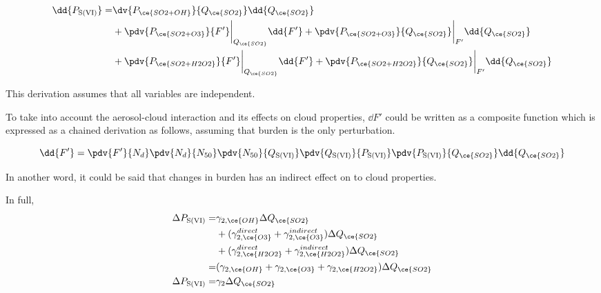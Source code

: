 \begin{equation}
\begin{aligned}
    \dd{P_{\text{S(VI)}}} = & 
    \dv{P_{\ce{SO2 + OH}}}{Q_{\ce{SO2}}} \dd{Q_{\ce{SO2}}} \\
    &+\pdv{P_{\ce{SO2 + O3}}}{F'}\bigg|_{Q_{\ce{SO2}}} \dd{F'} 
     +\pdv{P_{\ce{SO2 + O3}}}{Q_{\ce{SO2}}}\bigg|_{F'} \dd{Q_{\ce{SO2}}} \\
    &+\pdv{P_{\ce{SO2 + H2O2}}}{F'}\bigg|_{Q_{\ce{SO2}}} \dd{F'} 
     +\pdv{P_{\ce{SO2 + H2O2}}}{Q_{\ce{SO2}}}\bigg|_{F'} \dd{Q_{\ce{SO2}}} \\
\end{aligned}
\end{equation}

This derivation assumes that all variables are independent.

To take into account the aerosol-cloud interaction and its effects on cloud properties, $\dd{F'}$ could be written as a composite function which is expressed as a chained derivation as follows, assuming that  burden is the only perturbation.

\begin{equation}
    \dd{F'} = \pdv{F'}{N_d} \pdv{N_d}{N_{50}} \pdv{N_{50}}{Q_{\text{S(VI)}}} \pdv{Q_{\text{S(VI)}}}{P_{\text{S(VI)}}} \pdv{P_{\text{S(VI)}}}{Q_{\ce{SO2}}} \dd{Q_{\ce{SO2}}} \label{ch5:eq:dF/dQ}
\end{equation}

In another word, it could be said that changes in  burden has an indirect effect on to cloud properties.

In full, 
\begin{align}
    \Delta{P_{\text{S(VI)}}} 
    = & \gamma_{2,\ce{OH}} \Delta{Q_{\ce{SO2}}}\nonumber\\ 
      & + (\gamma_{2, \ce{O3}}^{direct} + \gamma_{2, \ce{O3}}^{indirect}) \Delta{Q_{\ce{SO2}}} \\ 
      & + (\gamma_{2, \ce{H2O2}}^{direct} + \gamma_{2, \ce{H2O2}}^{indirect}) \Delta{Q_{\ce{SO2}}} \nonumber\\
    = & (\gamma_{2,\ce{OH}} + \gamma_{2,\ce{O3}} + \gamma_{2,\ce{H2O2}}) \Delta{Q_{\ce{SO2}}} \\
     \Delta {P_{\text{S(VI)}}} = & \gamma_2 \Delta{Q_{\ce{SO2}}} 
\end{align}


